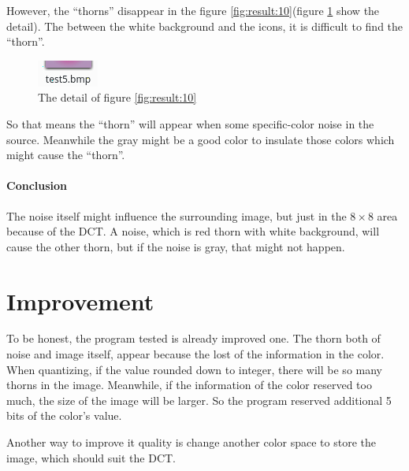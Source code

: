 \documentclass{article}
\begin{document}
However, the ``thorns'' disappear in the figure \ref{fig:result:10}(figure \ref{fig:ana:3} show the detail).
The between the white background and the icons, it is difficult to find the ``thorn''.

\begin{figure}
\centering
\includegraphics[width=0.67\linewidth]{hpeg-test/ana4}
\caption{The detail of figure \ref{fig:result:10}}
\label{fig:ana:3}
\end{figure}

So that means the ``thorn'' will appear when some specific-color noise in the source.
Meanwhile the gray might be a good color to insulate those colors which might cause the ``thorn''.

\paragraph{Conclusion}
The noise itself might influence the surrounding image, but just in the $8 \times 8$ area because of 
the DCT. A noise, which is red thorn with white background, will cause the other thorn,
but if the noise is gray, that might not happen.  

\section{Improvement}
\label{sec:improvement}

To be honest, the program tested is already improved one. The thorn both of noise and image itself,
appear because the lost of the information in the color. When quantizing, if the value rounded down
to integer, there will be so many thorns in the image. Meanwhile, if the information of the color
reserved too much, the size of the image will be larger. So the program reserved additional 5 bits
of the color's value.

Another way to improve it quality is change another color space to store the image, which should suit
the DCT.
\end{document}
